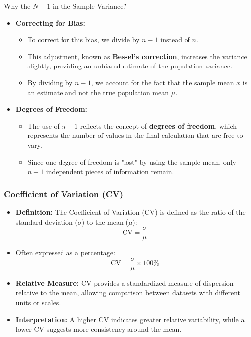 \documentclass[handout]{beamer} %
\begin{document}
\begin{frame}{Why the $N-1$ in the Sample Variance?}
\begin{itemize}
      \item \textbf{Correcting for Bias:}
    \begin{itemize}
        \item To correct for this bias, we divide by \( n-1 \) instead of \( n \).
        \item This adjustment, known as \textbf{Bessel's correction}, increases the variance slightly, providing an unbiased estimate of the population variance.
        \item By dividing by \( n-1 \), we account for the fact that the sample mean \(\bar{x}\) is an estimate and not the true population mean \(\mu\).
    \end{itemize}
    \vspace{1em}
    \item \textbf{Degrees of Freedom:}
    \begin{itemize}
        \item The use of \( n-1 \) reflects the concept of \textbf{degrees of freedom}, which represents the number of values in the final calculation that are free to vary.
        \item Since one degree of freedom is "lost" by using the sample mean, only \( n-1 \) independent pieces of information remain.
    \end{itemize}
\end{itemize}
\end{frame}


\begin{frame}
\frametitle{Coefficient of Variation (CV)}

\begin{minipage}{0.48\textwidth}
\centering
\begin{itemize}
    \item \textbf{Definition:} The Coefficient of Variation (CV) is defined as the ratio of the standard deviation (\(\sigma\)) to the mean (\(\mu\)):
    \[
    \text{CV} = \frac{\sigma}{\mu}
    \]
    \item Often expressed as a percentage:
    \[
    \text{CV} = \frac{\sigma}{\mu} \times 100\%
    \]
\end{itemize}
\end{minipage}
\hfill
\begin{minipage}{0.48\textwidth}
\centering
\begin{itemize}
    \item \textbf{Relative Measure:} CV provides a standardized measure of dispersion relative to the mean, allowing comparison between datasets with different units or scales.
    \item \textbf{Interpretation:} A higher CV indicates greater relative variability, while a lower CV suggests more consistency around the mean.
\end{itemize}
\end{minipage}

\end{frame}
\end{document}

